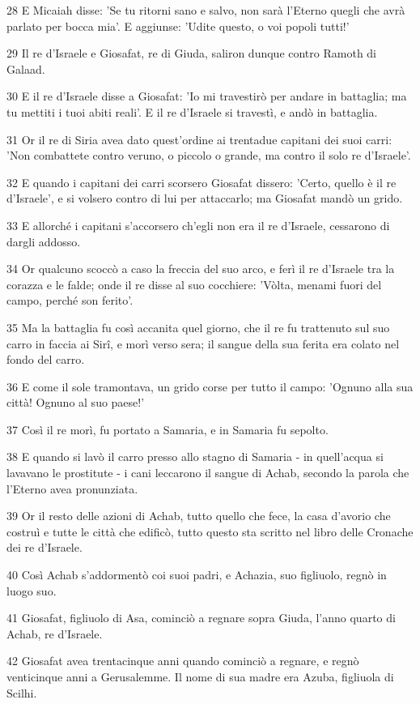 \par 28 E Micaiah disse: 'Se tu ritorni sano e salvo, non sarà l'Eterno quegli che avrà parlato per bocca mia'. E aggiunse: 'Udite questo, o voi popoli tutti!'
\par 29 Il re d'Israele e Giosafat, re di Giuda, saliron dunque contro Ramoth di Galaad.
\par 30 E il re d'Israele disse a Giosafat: 'Io mi travestirò per andare in battaglia; ma tu mettiti i tuoi abiti reali'. E il re d'Israele si travestì, e andò in battaglia.
\par 31 Or il re di Siria avea dato quest'ordine ai trentadue capitani dei suoi carri: 'Non combattete contro veruno, o piccolo o grande, ma contro il solo re d'Israele'.
\par 32 E quando i capitani dei carri scorsero Giosafat dissero: 'Certo, quello è il re d'Israele', e si volsero contro di lui per attaccarlo; ma Giosafat mandò un grido.
\par 33 E allorché i capitani s'accorsero ch'egli non era il re d'Israele, cessarono di dargli addosso.
\par 34 Or qualcuno scoccò a caso la freccia del suo arco, e ferì il re d'Israele tra la corazza e le falde; onde il re disse al suo cocchiere: 'Vòlta, menami fuori del campo, perché son ferito'.
\par 35 Ma la battaglia fu così accanita quel giorno, che il re fu trattenuto sul suo carro in faccia ai Sirî, e morì verso sera; il sangue della sua ferita era colato nel fondo del carro.
\par 36 E come il sole tramontava, un grido corse per tutto il campo: 'Ognuno alla sua città! Ognuno al suo paese!'
\par 37 Così il re morì, fu portato a Samaria, e in Samaria fu sepolto.
\par 38 E quando si lavò il carro presso allo stagno di Samaria - in quell'acqua si lavavano le prostitute - i cani leccarono il sangue di Achab, secondo la parola che l'Eterno avea pronunziata.
\par 39 Or il resto delle azioni di Achab, tutto quello che fece, la casa d'avorio che costruì e tutte le città che edificò, tutto questo sta scritto nel libro delle Cronache dei re d'Israele.
\par 40 Così Achab s'addormentò coi suoi padri, e Achazia, suo figliuolo, regnò in luogo suo.
\par 41 Giosafat, figliuolo di Asa, cominciò a regnare sopra Giuda, l'anno quarto di Achab, re d'Israele.
\par 42 Giosafat avea trentacinque anni quando cominciò a regnare, e regnò venticinque anni a Gerusalemme. Il nome di sua madre era Azuba, figliuola di Scilhi.
